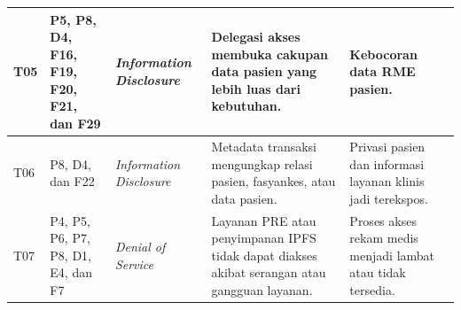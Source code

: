 {\begin{longtable}{|p{0.65cm}|p{2.2cm}|p{1.9cm}|p{4cm}|p{4cm}|}
	T05                                                                                                                                                                         &
	P5, P8, D4, F16, F19, F20, F21, dan F29                                                                                                                                     &
	\textit{Information Disclosure}                                                                                                                                             &
	Delegasi akses membuka cakupan data pasien yang lebih luas dari kebutuhan.                                                                                                  &
	Kebocoran data RME pasien.                                                                                                                                                                                                                                               \\
	\hline

	T06                                                                                                                                                                         &
	P8, D4, dan F22                                                                                                                                                             &
	\textit{Information Disclosure}                                                                                                                                             &
	Metadata transaksi mengungkap relasi pasien, fasyankes, atau data pasien.                                                                                                   &
	Privasi pasien dan informasi layanan klinis jadi terekspos.                                                                                                                                                                                                              \\
	\hline

	T07                                                                                                                                                                         &
	P4, P5, P6, P7, P8, D1, E4, dan F7                                                                                                                                          &
	\textit{Denial of Service}                                                                                                                                                  &
	Layanan PRE atau penyimpanan IPFS tidak dapat diakses akibat serangan atau gangguan layanan.                                                                                &
	Proses akses rekam medis menjadi lambat atau tidak tersedia.                                                                                                                                                                                                             \\
	\hline


\end{longtable}}
